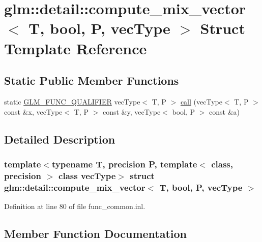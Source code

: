 \hypertarget{structglm_1_1detail_1_1compute__mix__vector_3_01_t_00_01bool_00_01_p_00_01vec_type_01_4}{}\section{glm\+:\+:detail\+:\+:compute\+\_\+mix\+\_\+vector$<$ T, bool, P, vec\+Type $>$ Struct Template Reference}
\label{structglm_1_1detail_1_1compute__mix__vector_3_01_t_00_01bool_00_01_p_00_01vec_type_01_4}
\subsection*{Static Public Member Functions}
\begin{DoxyCompactItemize}
\item 
static \hyperlink{setup_8hpp_a33fdea6f91c5f834105f7415e2a64407}{G\+L\+M\+\_\+\+F\+U\+N\+C\+\_\+\+Q\+U\+A\+L\+I\+F\+I\+ER} vec\+Type$<$ T, P $>$ \hyperlink{structglm_1_1detail_1_1compute__mix__vector_3_01_t_00_01bool_00_01_p_00_01vec_type_01_4_a8c1f32466902b61e306585f11d903212}{call} (vec\+Type$<$ T, P $>$ const \&x, vec\+Type$<$ T, P $>$ const \&y, vec\+Type$<$ bool, P $>$ const \&a)
\end{DoxyCompactItemize}


\subsection{Detailed Description}
\subsubsection*{template$<$typename T, precision P, template$<$ class, precision $>$ class vec\+Type$>$\newline
struct glm\+::detail\+::compute\+\_\+mix\+\_\+vector$<$ T, bool, P, vec\+Type $>$}



Definition at line 80 of file func\+\_\+common.\+inl.



\subsection{Member Function Documentation}
\mbox{\label{structglm_1_1detail_1_1compute__mix__vector_3_01_t_00_01bool_00_01_p_00_01vec_type_01_4_a8c1f32466902b61e306585f11d903212}} 

